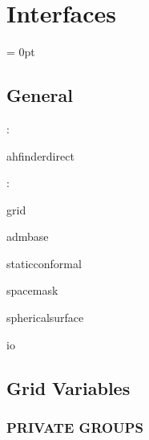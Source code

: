 
\section{Interfaces} 


\parskip = 0pt

\vspace{3mm} \subsection*{General}

: 

ahfinderdirect
\vspace{2mm}

: 

grid

admbase

staticconformal

spacemask

sphericalsurface

io
\vspace{2mm}
\subsection*{Grid Variables}
\vspace{5mm}\subsubsection{PRIVATE GROUPS}

\vspace{5mm}

